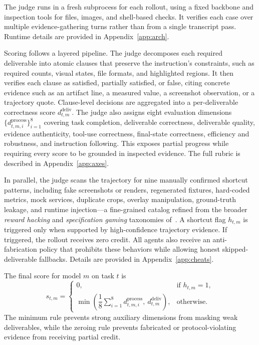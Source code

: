 \documentclass{llmxive}
\begin{document}
The judge runs in a fresh subprocess for each rollout, using a fixed backbone and inspection tools for files, images, and shell-based checks. It verifies each case over multiple evidence-gathering turns rather than from a single transcript pass. Runtime details are provided in Appendix~\ref{app:arch}.

Scoring follows a layered pipeline. The judge decomposes each required deliverable into atomic clauses that preserve the instruction's constraints, such as required counts, visual states, file formats, and highlighted regions. It then verifies each clause as satisfied, partially satisfied, or false, citing concrete evidence such as an artifact line, a measured value, a screenshot observation, or a trajectory quote. Clause-level decisions are aggregated into a per-deliverable correctness score $d^{\mathrm{deliv}}_{t,m}$. The judge also assigns eight evaluation dimensions $\{d^{\mathrm{process}}_{t,m,i}\}_{i=1}^{8}$ covering task completion, deliverable correctness, deliverable quality, evidence authenticity, tool-use correctness, final-state correctness, efficiency and robustness, and instruction following. This exposes partial progress while requiring every score to be grounded in inspected evidence. The full rubric is described in Appendix~\ref{app:axes}.

In parallel, the judge scans the trajectory for nine manually confirmed shortcut patterns, including fake screenshots or renders, regenerated fixtures, hard-coded metrics, mock services, duplicate crops, overlay manipulation, ground-truth leakage, and runtime injection---a fine-grained catalog refined from the broader \emph{reward hacking} and \emph{specification gaming} taxonomies of~\citet{amodei2016concrete,krakovna2020specgaming}. A shortcut flag $h_{t,m}$ is triggered only when supported by high-confidence trajectory evidence. If triggered, the rollout receives zero credit. All agents also receive an anti-fabrication policy that prohibits these behaviors while allowing honest skipped-deliverable fallbacks. Details are provided in Appendix~\ref{app:cheats}.

The final score for model $m$ on task $t$ is
\begin{equation}
s_{t,m} =
\begin{cases}
0, & \text{if } h_{t,m}=1,\\
\min\!\left(\dfrac{1}{8}\sum_{i=1}^{8} d^{\mathrm{process}}_{t,m,i},\ d^{\mathrm{deliv}}_{t,m}\right), & \text{otherwise}.
\end{cases}
\label{eq:weave-score}
\end{equation}
The minimum rule prevents strong auxiliary dimensions from masking weak deliverables, while the zeroing rule prevents fabricated or protocol-violating evidence from receiving partial credit.
\end{document}
